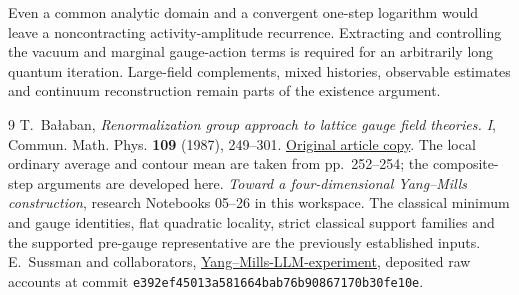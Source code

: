 \documentclass[11pt]{article}
\theoremstyle{remark}
\begin{document}
Even a common analytic domain and a convergent one-step logarithm
would leave a noncontracting activity-amplitude recurrence.
Extracting and controlling the vacuum and marginal gauge-action
terms is required for an arbitrarily long quantum iteration.
Large-field complements, mixed histories, observable estimates and
continuum reconstruction remain parts of the existence argument.

\begin{thebibliography}{9}
T.~Ba\l aban,
\emph{Renormalization group approach to lattice gauge field
theories. I},
Commun. Math. Phys. \textbf{109} (1987), 249--301.
\href{https://scispace.com/pdf/renormalization-group-approach-to-lattice-gauge-field-3ygai0vxt1.pdf}{Original article copy}.
The local ordinary average and contour mean are taken from
pp.~252--254; the composite-step arguments are developed here.
\emph{Toward a four-dimensional Yang--Mills construction},
research Notebooks 05--26 in this workspace.
The classical minimum and gauge identities, flat quadratic
locality, strict classical support families and the supported
pre-gauge representative are the previously established inputs.
E.~Sussman and collaborators,
\href{https://github.com/ethanwsussman/Yang--Mills-LLM-experiment}{Yang--Mills-LLM-experiment},
deposited raw accounts at commit
\texttt{e392ef4501\allowbreak 3a581664ba\allowbreak b76b908671\allowbreak 70b30fe10e}.
\end{thebibliography}
\end{document}
